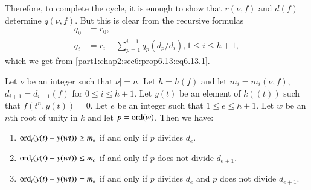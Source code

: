 Therefore, to complete the cycle, it is enough to show that $r (\nu, f)$ and $d(f)$ determine $q (\nu, f)$. But this is clear from the recursive formulas
\begin{align*}
  q_0 & = r_0,\\
  q_i & = r_i - \sum^{i-1}_{p=1} q_p (d_p/d_i), 1 \leq i \leq h+1,
\end{align*}
which we get from \ref{part1:chap2:sec6:prop6.13:eq6.13.1}.

\begin{lemma}\label{part1:chap2:sec6:lem6.14}
  Let $\nu$ be an integer such that$|\nu|=n$. Let $h= h(f)$ and let $m_i = m_i (\nu, f)$, $d_{i+1}= d_{i+1}(f)$ for $0 \leq i \leq h+1$. Let $y(t)$ be an element of $k((t))$ such that $f(t^n, y(t))=0$. Let $e$ be an integer such that $1\leq e \leq h+1$. Let $w$ be an $n$th root of unity in $k$ and let $p = \operatorname{ord} (w)$. Then we have:
\begin{enumerate}[\rm (i)]
\item $\operatorname{ord}_t (y(t)- y (w t))\geq m_e$ if and only if $p$ divides $d_e$.
\item $\operatorname{ord}_t (y(t)- y (w t))\leq m_e$ if and only if $p$ does not divide $d_{e+1}$.
\item $\operatorname{ord}_t (y(t)- y (w t)) = m_e$ if and only if $p$ divides $d_e$ and $p$ does not divide $d_{e+1}$.
\end{enumerate}
\end{lemma}

